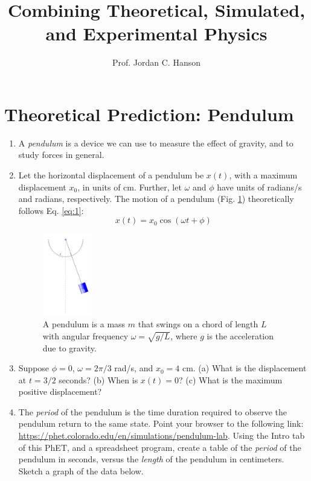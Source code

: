 \documentclass{article}
\begin{document}
\title{Combining Theoretical, Simulated, and Experimental Physics}
\author{Prof. Jordan C. Hanson}

\maketitle

\section{Theoretical Prediction: Pendulum}

\begin{enumerate}
\item A \textit{pendulum} is a device we can use to measure the effect of gravity, and to study forces in general.
\item Let the horizontal displacement of a pendulum be $x(t)$, with a maximum displacement $x_0$, in units of cm.  Further, let $\omega$ and $\phi$ have units of radians/s and radians, respectively. The motion of a pendulum (Fig. \ref{fig:pendulum}) theoretically follows Eq. \ref{eq:1}:
\begin{equation}
x(t) = x_0\cos(\omega t + \phi) \label{eq:1}
\end{equation} 
\begin{figure}[ht]
\centering
\includegraphics[width=0.2\textwidth]{pendulum.png}
\caption{\label{fig:pendulum} A pendulum is a mass $m$ that swings on a chord of length $L$ with angular frequency $\omega = \sqrt{g/L}$, where $g$ is the acceleration due to gravity.}
\end{figure}
\item Suppose $\phi = 0$, $\omega = 2\pi/3$ rad/s, and $x_0 = 4$ cm.  (a) What is the displacement at $t=3/2$ seconds? (b) When is $x(t) = 0$? (c) What is the maximum positive displacement? \\ \vspace{2cm}
\item The \textit{period} of the pendulum is the time duration required to observe the pendulum return to the same state.  Point your browser to the following link: \url{https://phet.colorado.edu/en/simulations/pendulum-lab}.  Using the Intro tab of this PhET, and a spreadsheet program, create a table of the \textit{period} of the pendulum in seconds, versus the \textit{length} of the pendulum in centimeters.  Sketch a graph of the data below. \\ \vspace{2cm}
\end{enumerate}
\end{document}
